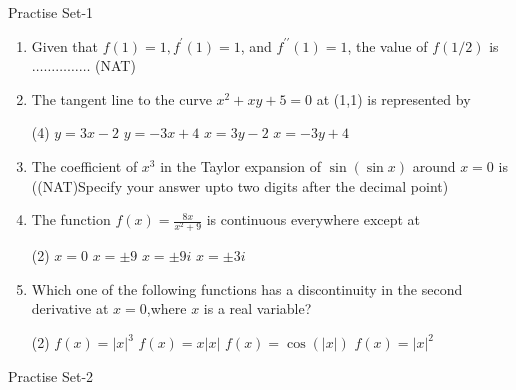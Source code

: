 \newpage
\begin{abox}
	Practise Set-1
\end{abox}
\begin{enumerate}
	\item Given that $f(1)=1, f^{\prime}(1)=1$, and $f^{\prime \prime}(1)=1$, the value of $f(1 / 2)$ is $\ldots \ldots \ldots \ldots \ldots$ (NAT){}
	
	\item  The tangent line to the curve $x^{2}+x y+5=0$ at (1,1) is represented by 
	{}
	\begin{tasks}(4)
		\task[\textbf{a.}] $y=3 x-2$
		\task[\textbf{b.}]$y=-3 x+4$
		\task[\textbf{c.}] $x=3 y-2$
		\task[\textbf{d.}] $x=-3 y+4$
	\end{tasks}
	
	\item The coefficient of $x^{3}$ in the Taylor expansion of $\sin (\sin x)$ around $x=0$ is
	((NAT)Specify your answer upto two digits after the decimal point){}
	\item The function $f(x)=\frac{8 x}{x^{2}+9}$ is continuous everywhere except at
	\begin{tasks}(2)
		\task[\textbf{a.}]  $x=0$ 
		\task[\textbf{b.}] $x=\pm 9$
		\task[\textbf{c.}] $x=\pm 9 i$
		\task[\textbf{d.}] $x=\pm 3 i$ 
	\end{tasks}
	\item Which one of the following functions has a discontinuity in the second derivative at $x=0$,where $x$ is a real variable?{}
	\begin{tasks}(2)
		\task[\textbf{a.}] $f(x)=|x|^{3}$  
		\task[\textbf{b.}] $f(x)=x|x|$
		\task[\textbf{c.}] $f(x)=\cos (|x|)$
		\task[\textbf{d.}] $f(x)=|x|^{2}$
	\end{tasks}
\end{enumerate}
\newpage
\begin{abox}
	Practise Set-2
\end{abox}
